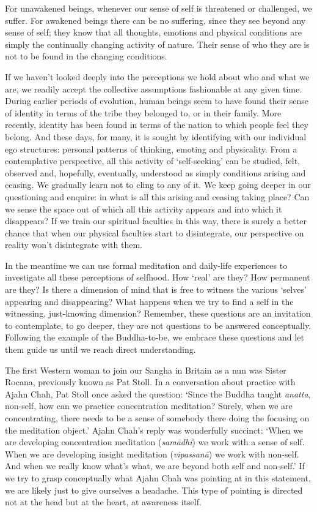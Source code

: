 For unawakened beings, whenever our sense of self is threatened or
challenged, we suffer. For awakened beings there can be no suffering,
since they see beyond any sense of self; they know that all thoughts,
emotions and physical conditions are simply the continually changing
activity of nature. Their sense of who they are is not to be found in
the changing conditions.

If we haven’t looked deeply into the perceptions we hold about who and
what we are, we readily accept the collective assumptions fashionable at
any given time. During earlier periods of evolution, human beings seem
to have found their sense of identity in terms of the tribe they
belonged to, or in their family. More recently, identity has been found
in terms of the nation to which people feel they belong. And these days,
for many, it is sought by identifying with our individual ego
structures: personal patterns of thinking, emoting and physicality. From
a contemplative perspective, all this activity of ‘self-seeking’ can be
studied, felt, observed and, hopefully, eventually, understood as simply
conditions arising and ceasing. We gradually learn not to cling to any
of it. We keep going deeper in our questioning and enquire: in what is
all this arising and ceasing taking place? Can we sense the space out of
which all this activity appears and into which it disappears? If we
train our spiritual
faculties\cite{faculties}
in this way, there is surely a better
chance that when our physical faculties start to disintegrate, our
perspective on reality won’t disintegrate with them.

In the meantime we can use formal meditation and daily-life experiences
to investigate all these perceptions of selfhood. How ‘real’ are they?
How permanent are they? Is there a dimension of mind that is free to
witness the various ‘selves’ appearing and disappearing? What happens
when we try to find a self in the witnessing, just-knowing dimension?
Remember, these questions are an invitation to contemplate, to go
deeper, they are not questions to be answered conceptually. Following
the example of the Buddha-to-be, we embrace these questions and let them
guide us until we reach direct understanding.

The first Western woman to join our Sangha in Britain as a nun was
Sister Rocana, previously known as Pat Stoll. In a conversation about
practice with Ajahn Chah, Pat Stoll once asked the question: ‘Since the
Buddha taught \emph{anatta}, non-self, how can we practice concentration
meditation? Surely, when we are concentrating, there needs to be a sense
of somebody there doing the focusing on the meditation object.’ Ajahn
Chah’s reply was wonderfully succinct: ‘When we are developing
concentration meditation (\emph{samādhi}) we work with a sense of self. When
we are developing insight meditation (\emph{vipassanā}) we work with
non-self. And when we really know what’s what, we are beyond both self
and non-self.’ If we try to grasp conceptually what Ajahn Chah was
pointing at in this statement, we are likely just to give ourselves a
headache. This type of pointing is directed not at the head but at the
heart, at awareness itself.

